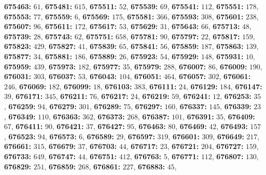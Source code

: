 \textsf{\bfseries 675463:} $61$, \textsf{\bfseries 675481:} $615$, \textsf{\bfseries 675511:} $52$, \textsf{\bfseries 675539:} $69$, \textsf{\bfseries 675541:} $112$, \textsf{\bfseries 675551:} $178$, \textsf{\bfseries 675553:} $77$, \textsf{\bfseries 675559:} $6$, \textsf{\bfseries 675569:} $175$, \textsf{\bfseries 675581:} $366$, \textsf{\bfseries 675593:} $308$, \textsf{\bfseries 675601:} $238$, \textsf{\bfseries 675607:} $96$, \textsf{\bfseries 675611:} $172$, \textsf{\bfseries 675617:} $53$, \textsf{\bfseries 675629:} $31$, \textsf{\bfseries 675643:} $66$, \textsf{\bfseries 675713:} $48$, \textsf{\bfseries 675739:} $28$, \textsf{\bfseries 675743:} $62$, \textsf{\bfseries 675751:} $658$, \textsf{\bfseries 675781:} $90$, \textsf{\bfseries 675797:} $22$, \textsf{\bfseries 675817:} $159$, \textsf{\bfseries 675823:} $429$, \textsf{\bfseries 675827:} $41$, \textsf{\bfseries 675839:} $65$, \textsf{\bfseries 675841:} $56$, \textsf{\bfseries 675859:} $187$, \textsf{\bfseries 675863:} $139$, \textsf{\bfseries 675877:} $34$, \textsf{\bfseries 675881:} $186$, \textsf{\bfseries 675889:} $26$, \textsf{\bfseries 675923:} $54$, \textsf{\bfseries 675929:} $148$, \textsf{\bfseries 675931:} $10$, \textsf{\bfseries 675959:} $439$, \textsf{\bfseries 675973:} $182$, \textsf{\bfseries 675977:} $35$, \textsf{\bfseries 675979:} $288$, \textsf{\bfseries 676007:} $86$, \textsf{\bfseries 676009:} $190$, \textsf{\bfseries 676031:} $303$, \textsf{\bfseries 676037:} $53$, \textsf{\bfseries 676043:} $104$, \textsf{\bfseries 676051:} $464$, \textsf{\bfseries 676057:} $302$, \textsf{\bfseries 676061:} $246$, \textsf{\bfseries 676069:} $182$, \textsf{\bfseries 676099:} $18$, \textsf{\bfseries 676103:} $383$, \textsf{\bfseries 676111:} $24$, \textsf{\bfseries 676129:} $184$, \textsf{\bfseries 676147:} $39$, \textsf{\bfseries 676171:} $345$, \textsf{\bfseries 676211:} $76$, \textsf{\bfseries 676217:} $24$, \textsf{\bfseries 676219:} $59$, \textsf{\bfseries 676241:} $12$, \textsf{\bfseries 676253:} $35$, \textsf{\bfseries 676259:} $94$, \textsf{\bfseries 676279:} $301$, \textsf{\bfseries 676289:} $75$, \textsf{\bfseries 676297:} $160$, \textsf{\bfseries 676337:} $145$, \textsf{\bfseries 676339:} $23$, \textsf{\bfseries 676349:} $110$, \textsf{\bfseries 676363:} $362$, \textsf{\bfseries 676373:} $268$, \textsf{\bfseries 676387:} $101$, \textsf{\bfseries 676391:} $35$, \textsf{\bfseries 676409:} $67$, \textsf{\bfseries 676411:} $90$, \textsf{\bfseries 676421:} $37$, \textsf{\bfseries 676427:} $95$, \textsf{\bfseries 676463:} $80$, \textsf{\bfseries 676469:} $42$, \textsf{\bfseries 676493:} $157$, \textsf{\bfseries 676523:} $94$, \textsf{\bfseries 676573:} $6$, \textsf{\bfseries 676589:} $29$, \textsf{\bfseries 676597:} $319$, \textsf{\bfseries 676601:} $309$, \textsf{\bfseries 676649:} $217$, \textsf{\bfseries 676661:} $315$, \textsf{\bfseries 676679:} $37$, \textsf{\bfseries 676703:} $44$, \textsf{\bfseries 676717:} $23$, \textsf{\bfseries 676721:} $204$, \textsf{\bfseries 676727:} $159$, \textsf{\bfseries 676733:} $649$, \textsf{\bfseries 676747:} $44$, \textsf{\bfseries 676751:} $412$, \textsf{\bfseries 676763:} $5$, \textsf{\bfseries 676771:} $112$, \textsf{\bfseries 676807:} $130$, \textsf{\bfseries 676829:} $251$, \textsf{\bfseries 676859:} $268$, \textsf{\bfseries 676861:} $227$, \textsf{\bfseries 676883:} $45$, 
